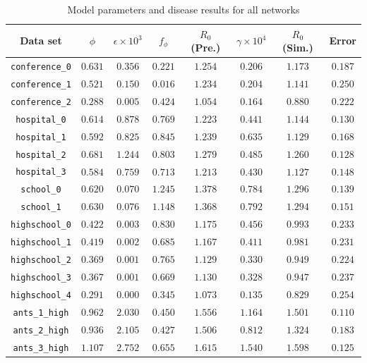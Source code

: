 \documentclass[twocolumn,8pt]{article}
\begin{document}
 \begin{table}[p] 
 \small
 \centering 
 \caption{Model parameters and disease results for all networks} 
 \label{disease_table} 
\begin{tabular}{c|ccccccc} 
Data set & $\phi$ & $\epsilon \times 10^{3}$ & $f_{\phi}$ & $R_{0}$ (Pre.) & $\gamma \times 10^{4}$ & $R_{0}$ (Sim.) & Error \\ 
\midrule 
\verb|conference_0| & $0.631$ & $0.356$ & $0.221$ & $1.254$ & $0.206$ & $1.173$ & $0.187$\\
\verb|conference_1| & $0.521$ & $0.150$ & $0.016$ & $1.234$ & $0.204$ & $1.141$ & $0.250$\\
\verb|conference_2| & $0.288$ & $0.005$ & $0.424$ & $1.054$ & $0.164$ & $0.880$ & $0.222$\\
\verb|hospital_0| & $0.614$ & $0.878$ & $0.769$ & $1.223$ & $0.441$ & $1.144$ & $0.130$\\
\verb|hospital_1| & $0.592$ & $0.825$ & $0.845$ & $1.239$ & $0.635$ & $1.129$ & $0.168$\\
\verb|hospital_2| & $0.681$ & $1.244$ & $0.803$ & $1.279$ & $0.485$ & $1.260$ & $0.128$\\
\verb|hospital_3| & $0.584$ & $0.759$ & $0.713$ & $1.213$ & $0.430$ & $1.127$ & $0.148$\\
\verb|school_0| & $0.620$ & $0.070$ & $1.245$ & $1.378$ & $0.784$ & $1.296$ & $0.139$\\
\verb|school_1| & $0.630$ & $0.076$ & $1.148$ & $1.368$ & $0.792$ & $1.294$ & $0.151$\\
\verb|highschool_0| & $0.422$ & $0.003$ & $0.830$ & $1.175$ & $0.456$ & $0.993$ & $0.233$\\
\verb|highschool_1| & $0.419$ & $0.002$ & $0.685$ & $1.167$ & $0.411$ & $0.981$ & $0.231$\\
\verb|highschool_2| & $0.369$ & $0.001$ & $0.765$ & $1.129$ & $0.330$ & $0.949$ & $0.224$\\
\verb|highschool_3| & $0.367$ & $0.001$ & $0.669$ & $1.130$ & $0.328$ & $0.947$ & $0.237$\\
\verb|highschool_4| & $0.291$ & $0.000$ & $0.345$ & $1.073$ & $0.135$ & $0.829$ & $0.254$\\
\verb|ants_1_high| & $0.962$ & $2.030$ & $0.450$ & $1.556$ & $1.164$ & $1.501$ & $0.110$\\
\verb|ants_2_high| & $0.936$ & $2.105$ & $0.427$ & $1.506$ & $0.812$ & $1.324$ & $0.183$\\
\verb|ants_3_high| & $1.107$ & $2.752$ & $0.655$ & $1.615$ & $1.540$ & $1.598$ & $0.125$\\

\end{tabular}
\end{table}
\end{document}
